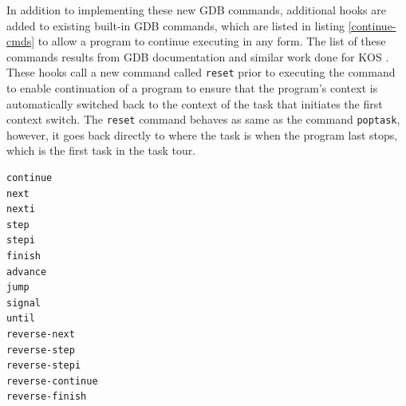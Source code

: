 In addition to implementing these new GDB commands, additional hooks are added
to existing built-in GDB commands, which are listed in listing
\ref{continue-cmds} to allow
a program to continue executing in any form. The list of these commands
results from GDB documentation \cite{reference15} and similar work done for KOS
\cite{reference14}. These hooks
call a new command called \verb|reset| prior to executing the command to enable
continuation of a program to ensure that
the program's context is automatically switched back to the context of the task
that initiates the first context switch. The \verb|reset| command behaves as
same as the command \verb|poptask|, however, it goes back directly to where the
task is when the program last stops, which is the first task in the task tour.

\begin{lstlisting}[caption={Built-in GDB commands that allow continuation of a
program}, label={continue-cmds}]
continue
next
nexti
step
stepi
finish
advance
jump
signal
until
reverse-next
reverse-step
reverse-stepi
reverse-continue
reverse-finish
\end{lstlisting}


